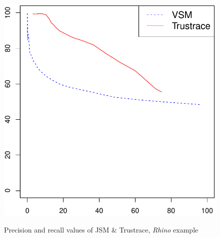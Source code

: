 \documentclass[12pt,hyperref=true,mathserif]{beamer}
\begin{document}
\begin{frame}
\begin{figure}
  \centering
  \includegraphics[scale=0.5]{js_normalised_rhino_2exp}\\
  \caption{Precision and recall values of JSM \& Trustrace, \textit{Rhino} example}\label{fig:JSMRhino}
\end{figure}
\end{frame}
\end{document}
